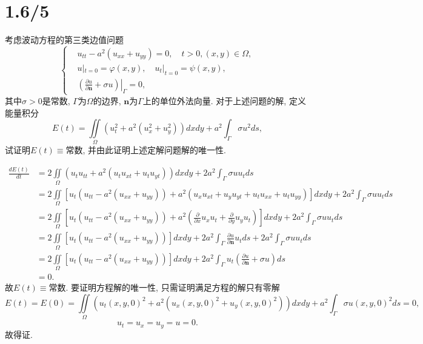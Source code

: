 \documentclass[11pt,a4paper]{article}
\begin{document}
\section{1.6/5}
\begin{problem}
考虑波动方程的第三类边值问题
$$\left\{\begin{aligned}
     & u_{tt}-a^2(u_{xx}+u_{yy})=0,\quad t>0,(x,y)\in\Omega,                               \\
     & u|_{t=0}=\varphi(x,y),\quad u_t|_{t=0}=\psi(x,y),                                   \\
     & \left.\left(\frac{\partial u}{\partial \mathbf{n}}+\sigma u\right)\right|_\Gamma=0,
  \end{aligned}\right.$$
其中$\sigma>0$是常数, $\Gamma$为$\Omega$的边界, $\mathbf{n}$为$\Gamma$上的单位外法向量. 对于上述问题的解, 定义能量积分
$$E(t)=\iint\limits_\Omega(u_t^2+a^2(u_x^2+u_y^2))dxdy+a^2\int_\Gamma\sigma u^2ds,$$
试证明$E(t)\equiv$常数, 并由此证明上述定解问题解的唯一性.
\end{problem}

\begin{align*}
  \frac{dE(t)}{dt}
   & =2\iint\limits_\Omega(u_tu_{tt}+a^2(u_tu_{xt}+u_tu_{yt}))dxdy+2a^2\int_\Gamma\sigma uu_tds                                                                                            \\
   & =2\iint\limits_\Omega\left[u_t(u_{tt}-a^2(u_{xx}+u_{yy}))+a^2(u_xu_{xt}+u_yu_{yt}+u_tu_{xx}+u_tu_{yy})\right]dxdy+2a^2\int_\Gamma\sigma uu_tds                                        \\
   & =2\iint\limits_\Omega\left[u_t(u_{tt}-a^2(u_{xx}+u_{yy}))+a^2\left(\frac{\partial}{\partial x}u_xu_t+\frac{\partial}{\partial y}u_yu_t\right)\right]dxdy+2a^2\int_\Gamma\sigma uu_tds \\
   & =2\iint\limits_\Omega\left[u_t(u_{tt}-a^2(u_{xx}+u_{yy}))\right]dxdy+2a^2\int_\Gamma\frac{\partial u}{\partial\mathbf{n}}u_tds+2a^2\int_\Gamma\sigma uu_tds                           \\
   & =2\iint\limits_\Omega\left[u_t(u_{tt}-a^2(u_{xx}+u_{yy}))\right]dxdy+2a^2\int_\Gamma u_t\left(\frac{\partial u}{\partial \mathbf{n}}+\sigma u\right)ds                                \\
   & =0.
\end{align*}
故$E(t)\equiv$常数. 要证明方程解的唯一性, 只需证明满足方程的解只有零解
$$E(t)=E(0)=\iint\limits_\Omega(u_t(x,y,0)^2+a^2(u_x(x,y,0)^2+u_y(x,y,0)^2))dxdy+a^2\int_\Gamma\sigma u(x,y,0)^2ds=0,$$
$$u_t=u_x=u_y=u=0.$$
故得证.
\end{document}
